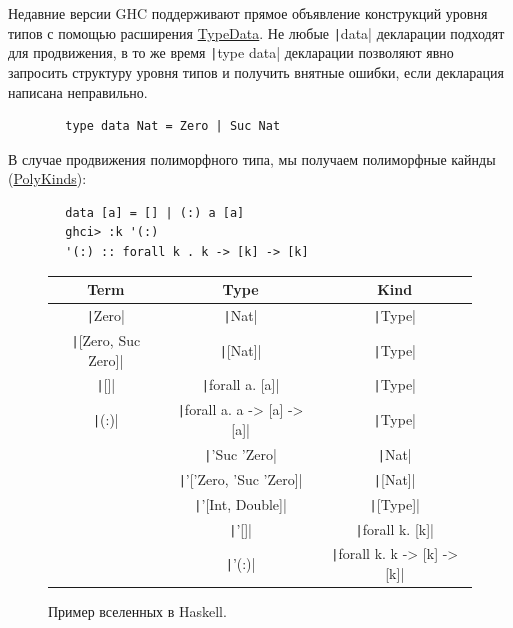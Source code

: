 \documentclass[12pt]{article}
\begin{document}
    Недавние версии GHC поддерживают прямое объявление конструкций уровня типов с помощью расширения \href{https://downloads.haskell.org/ghc/latest/docs/users_guide/exts/type_data.html#extension-TypeData}{TypeData}.
    Не любые \texttt|data| декларации подходят для продвижения, в то же время \texttt|type data| декларации позволяют явно запросить структуру уровня типов и получить внятные ошибки, если декларация написана неправильно.
    \begin{verbatim}
        type data Nat = Zero | Suc Nat
    \end{verbatim}

    В случае продвижения полиморфного типа, мы получаем полиморфные кайнды (\href{https://downloads.haskell.org/ghc/latest/docs/users_guide/exts/poly_kinds.html}{PolyKinds}):
    \begin{verbatim}
        data [a] = [] | (:) a [a]
        ghci> :k '(:)
        '(:) :: forall k . k -> [k] -> [k]
    \end{verbatim}

    \begin{figure}
        \centering
        \begin{tabular}{|c|c|c|}
            \hline
            Term                                   & Type                                            & Kind                                            \\
            \hline
            \texttt|Zero|             & \texttt|Nat|                       & \texttt|Type|                      \\
            \texttt|[Zero, Suc Zero]| & \texttt|[Nat]|                     & \texttt|Type|                      \\
            \texttt|[]|               & \texttt|forall a. [a]|             & \texttt|Type|                      \\
            \texttt|(:)|              & \texttt|forall a. a -> [a] -> [a]| & \texttt|Type|                      \\
            & \texttt|'Suc 'Zero|                & \texttt|Nat|                       \\
            & \texttt|'['Zero, 'Suc 'Zero]|      & \texttt|[Nat]|                     \\
            & \texttt|'[Int, Double]|            & \texttt|[Type]|                    \\
            & \texttt|'[]|                       & \texttt|forall k. [k]|             \\
            & \texttt|'(:)|                      & \texttt|forall k. k -> [k] -> [k]| \\
            \hline
        \end{tabular}
        \caption{Пример вселенных в Haskell.}
        \label{fig:universes}
    \end{figure}
\end{document}
